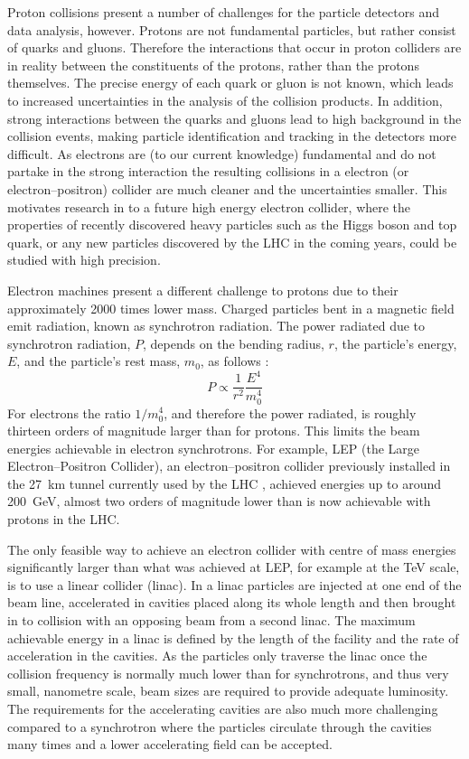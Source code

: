 Proton collisions present a number of challenges for the particle detectors and data analysis, however. Protons are not fundamental particles, but rather consist of quarks and gluons. Therefore the interactions that occur in proton colliders are in reality between the constituents of the protons, rather than the protons themselves. The precise energy of each quark or gluon is not known, which leads to increased uncertainties in the analysis of the collision products. In addition, strong interactions between the quarks and gluons lead to high background in the collision events, making particle identification and tracking in the detectors more difficult. As electrons are (to our current knowledge) fundamental and do not partake in the strong interaction the resulting collisions in a electron (or electron--positron) collider are much cleaner and the uncertainties smaller. This motivates research in to a future high energy electron collider, where the properties of recently discovered heavy particles such as the Higgs boson and top quark, or any new particles discovered by the LHC in the coming years, could be studied with high precision. 

Electron machines present a different challenge to protons due to their approximately 2000 times lower mass. 
Charged particles bent in a magnetic field emit radiation, known as synchrotron radiation. The power radiated due to synchrotron radiation, \(P\), depends on the bending radius, \(r\), the particle's energy, \(E\), and the particle's rest mass, \(m_0\), as follows \cite{wilson}:
\begin{equation}
P \propto \frac{1}{r^2} \frac{E^4}{m_0^4}
\end{equation}
For electrons the ratio \(1/m_0^4\), and therefore the power radiated, is roughly thirteen orders of magnitude larger than for protons. This limits the beam energies achievable in electron synchrotrons. For example, LEP (the Large Electron--Positron Collider), an electron--positron collider previously installed in the 27~km tunnel currently used by the LHC \cite{LEP}, achieved energies up to around 200~GeV, almost two orders of magnitude lower than is now achievable with protons in the LHC.

The only feasible way to achieve an electron collider with centre of mass energies significantly larger than what was achieved at LEP, for example at the TeV scale, is to use a linear collider (linac). In a linac particles are injected at one end of the beam line, accelerated in cavities placed along its whole length and then brought in to collision with an opposing beam from a second linac. The maximum achievable energy in a linac is defined by the length of the facility and the rate of acceleration in the cavities. As the particles only traverse the linac once the collision frequency is normally much lower than for synchrotrons, and thus very small, nanometre scale, beam sizes are required to provide adequate luminosity. The requirements for the accelerating cavities are also much more challenging compared to a synchrotron where the particles circulate through the cavities many times and a lower accelerating field can be accepted.

